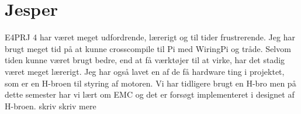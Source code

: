 \section{Jesper} 

E4PRJ 4 har været meget udfordrende, lærerigt og til tider frustrerende. Jeg har brugt meget tid på at kunne crosscompile til Pi med WiringPi og tråde. Selvom tiden kunne været brugt bedre, end at få værktøjer til at virke, har det stadig været meget lærerigt. Jeg har også lavet en af de få hardware ting i projektet, som er en H-broen til styring af motoren. Vi har tidligere brugt en H-bro men på dette semester har vi lært om EMC og det er forsøgt implementeret i designet af H-broen.
\newline 
skriv skriv mere
